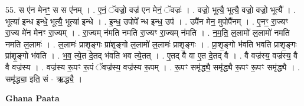 \documentclass[17pt]{extarticle}
\begin{document}
55. स ए॑न मेनꣳ॒॒ स स ए॑नम् । . ए॒नं॒ ॅवज्रो॒ वज्र॑ एन मेनं॒ ॅवज्रः॑ । . वज्रो॒ भूत्यै॒ भूत्यै॒ वज्रो॒ वज्रो॒ भूत्यै᳚ । . भूत्या॑ इन्ध इन्धे॒ भूत्यै॒ भूत्या॑ इन्धे । . इ॒न्ध॒ उपोपे᳚ न्ध इन्ध॒ उप॑ । . उपै॑न मेन॒ मुपोपै॑नम् । . ए॒नꣳ॒॒ रा॒ज्यꣳ रा॒ज्य मे॑न मेनꣳ रा॒ज्यम् । . रा॒ज्यम् न॑मति नमति रा॒ज्यꣳ रा॒ज्यम् न॑मति । . न॒म॒ति॒ ल॒लामो॑ ल॒लामो॑ नमति नमति ल॒लामः॑ । . ल॒लामः॑ प्राशृ॒ङ्गः प्रा॑शृ॒ङ्गो ल॒लामो॑ ल॒लामः॑ प्राशृ॒ङ्गः । . प्रा॒शृ॒ङ्गो भ॑वति भवति प्राशृ॒ङ्गः प्रा॑शृ॒ङ्गो भ॑वति । . भ॒व॒ त्ये॒त दे॒तद् भ॑वति भव त्ये॒तत् । . ए॒तद् वै वा ए॒त दे॒तद् वै । . वै वज्र॑स्य॒ वज्र॑स्य॒ वै वै वज्र॑स्य । . वज्र॑स्य रू॒पꣳ रू॒पं ॅवज्र॑स्य॒ वज्र॑स्य रू॒पम् । . रू॒पꣳ समृ॑द्ध्यै॒ समृ॑द्ध्यै रू॒पꣳ रू॒पꣳ समृ॑द्ध्यै । . समृ॑द्ध्या॒ इति॒ सं - ऋ॒द्ध्यै॒ । \newline

\textbf{Ghana Paata } \newline
\end{document}
